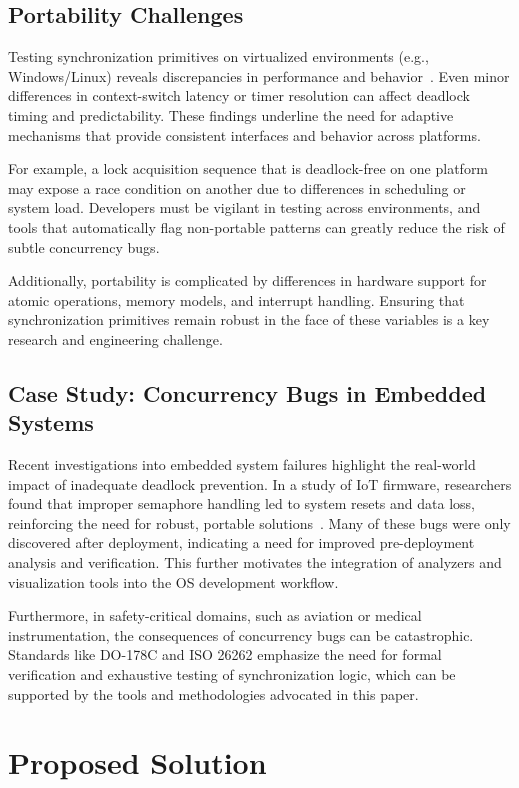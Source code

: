 \documentclass[conference,a4paper]{IEEEtran}
\begin{document}
\subsection{Portability Challenges}

Testing synchronization primitives on virtualized environments (e.g., Windows/Linux) reveals discrepancies in performance and behavior~\cite{arxiv}. Even minor differences in context-switch latency or timer resolution can affect deadlock timing and predictability. These findings underline the need for adaptive mechanisms that provide consistent interfaces and behavior across platforms.

For example, a lock acquisition sequence that is deadlock-free on one platform may expose a race condition on another due to differences in scheduling or system load. Developers must be vigilant in testing across environments, and tools that automatically flag non-portable patterns can greatly reduce the risk of subtle concurrency bugs.

Additionally, portability is complicated by differences in hardware support for atomic operations, memory models, and interrupt handling. Ensuring that synchronization primitives remain robust in the face of these variables is a key research and engineering challenge.

\subsection{Case Study: Concurrency Bugs in Embedded Systems}

Recent investigations into embedded system failures highlight the real-world impact of inadequate deadlock prevention. In a study of IoT firmware, researchers found that improper semaphore handling led to system resets and data loss, reinforcing the need for robust, portable solutions~\cite{wisconsin}. Many of these bugs were only discovered after deployment, indicating a need for improved pre-deployment analysis and verification. This further motivates the integration of analyzers and visualization tools into the OS development workflow.

Furthermore, in safety-critical domains, such as aviation or medical instrumentation, the consequences of concurrency bugs can be catastrophic. Standards like DO-178C and ISO 26262 emphasize the need for formal verification and exhaustive testing of synchronization logic, which can be supported by the tools and methodologies advocated in this paper.

\section{Proposed Solution}
\end{document}
